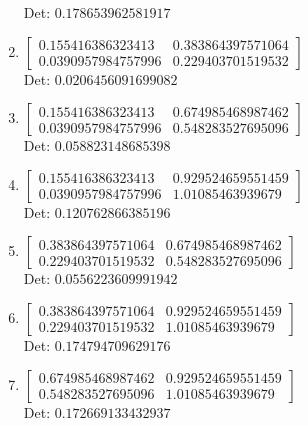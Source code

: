 \documentclass[12pt]{article}
\begin{document}
\begin{enumerate}
Det: $0.178653962581917$\\

\item $\displaystyle \left[\begin{matrix}0.155416386323413 & 0.383864397571064\\0.0390957984757996 & 0.229403701519532\end{matrix}\right]$\\

Det: $0.0206456091699082$\\

\item $\displaystyle \left[\begin{matrix}0.155416386323413 & 0.674985468987462\\0.0390957984757996 & 0.548283527695096\end{matrix}\right]$\\

Det: $0.058823148685398$\\

\item $\displaystyle \left[\begin{matrix}0.155416386323413 & 0.929524659551459\\0.0390957984757996 & 1.01085463939679\end{matrix}\right]$\\

Det: $0.120762866385196$\\

\item $\displaystyle \left[\begin{matrix}0.383864397571064 & 0.674985468987462\\0.229403701519532 & 0.548283527695096\end{matrix}\right]$\\

Det: $0.0556223609991942$\\

\item $\displaystyle \left[\begin{matrix}0.383864397571064 & 0.929524659551459\\0.229403701519532 & 1.01085463939679\end{matrix}\right]$\\

Det: $0.174794709629176$\\

\item $\displaystyle \left[\begin{matrix}0.674985468987462 & 0.929524659551459\\0.548283527695096 & 1.01085463939679\end{matrix}\right]$\\

Det: $0.172669133432937$\\

\end{enumerate}
\end{document}
